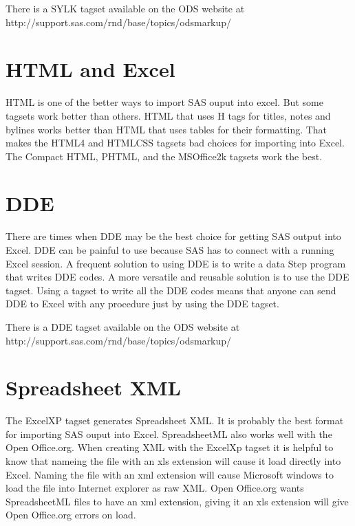 There is a SYLK tagset available on the ODS website at 
http://support.sas.com/rnd/base/topics/odsmarkup/

\section{HTML and Excel}
HTML is one of the better ways to import SAS ouput into excel.  But
some tagsets work better than others.  HTML that uses H tags for 
titles, notes and bylines works better than HTML that uses tables
for their formatting.  That makes the HTML4 and HTMLCSS tagsets 
bad choices for importing into Excel.  The Compact HTML, PHTML, and
the MSOffice2k tagsets work the best.  


\section{DDE}
There are times when DDE may be the best choice for getting SAS output
into Excel.  DDE can be painful to use because SAS has to connect with
a running Excel session.  A frequent solution to using DDE is to write
a data Step program that writes DDE codes.   A more versatile and reusable
solution is to use the DDE tagset.  Using a tagset to write all the DDE codes
means that anyone can send DDE to Excel with any procedure just by using the 
DDE tagset.

There is a DDE tagset available on the ODS website at 
http://support.sas.com/rnd/base/topics/odsmarkup/


\section{Spreadsheet XML}
The ExcelXP tagset generates Spreadsheet XML.  It is probably the best
format for importing SAS ouput into Excel.  SpreadsheetML also works
well with the Open Office.org.  When creating XML with the ExcelXp tagset
it is helpful to know that nameing the file with an xls extension will
cause it load directly into Excel.  Naming the file with an xml extension
will cause Microsoft windows to load the file into Internet explorer as
raw XML.  Open Office.org wants SpreadsheetML files to have an xml extension,
giving it an xls extension will give Open Office.org errors on load. 
 
